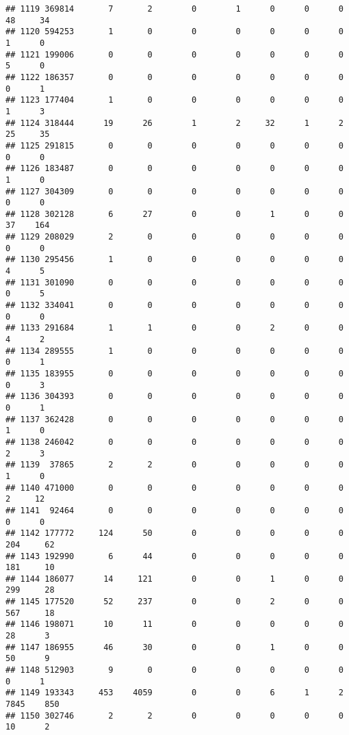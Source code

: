 \documentclass[
]{article}
\begin{document}
\begin{verbatim}
## 1119 369814       7       2        0        1      0      0      0    48     34
## 1120 594253       1       0        0        0      0      0      0     1      0
## 1121 199006       0       0        0        0      0      0      0     5      0
## 1122 186357       0       0        0        0      0      0      0     0      1
## 1123 177404       1       0        0        0      0      0      0     1      3
## 1124 318444      19      26        1        2     32      1      2    25     35
## 1125 291815       0       0        0        0      0      0      0     0      0
## 1126 183487       0       0        0        0      0      0      0     1      0
## 1127 304309       0       0        0        0      0      0      0     0      0
## 1128 302128       6      27        0        0      1      0      0    37    164
## 1129 208029       2       0        0        0      0      0      0     0      0
## 1130 295456       1       0        0        0      0      0      0     4      5
## 1131 301090       0       0        0        0      0      0      0     0      5
## 1132 334041       0       0        0        0      0      0      0     0      0
## 1133 291684       1       1        0        0      2      0      0     4      2
## 1134 289555       1       0        0        0      0      0      0     0      1
## 1135 183955       0       0        0        0      0      0      0     0      3
## 1136 304393       0       0        0        0      0      0      0     0      1
## 1137 362428       0       0        0        0      0      0      0     1      0
## 1138 246042       0       0        0        0      0      0      0     2      3
## 1139  37865       2       2        0        0      0      0      0     1      0
## 1140 471000       0       0        0        0      0      0      0     2     12
## 1141  92464       0       0        0        0      0      0      0     0      0
## 1142 177772     124      50        0        0      0      0      0   204     62
## 1143 192990       6      44        0        0      0      0      0   181     10
## 1144 186077      14     121        0        0      1      0      0   299     28
## 1145 177520      52     237        0        0      2      0      0   567     18
## 1146 198071      10      11        0        0      0      0      0    28      3
## 1147 186955      46      30        0        0      1      0      0    50      9
## 1148 512903       9       0        0        0      0      0      0     0      1
## 1149 193343     453    4059        0        0      6      1      2  7845    850
## 1150 302746       2       2        0        0      0      0      0    10      2

\end{verbatim}
\end{document}
